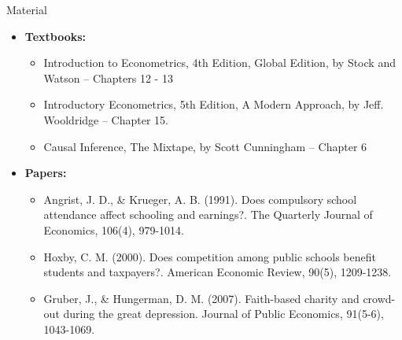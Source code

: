 \documentclass[notes,10pt, aspectratio=169]{beamer}
\begin{document}
\begin{frame}[allowframebreaks]{Material}
\begin{itemize}
    \item[--] \textbf{Textbooks:}
    \begin{itemize}
        \item Introduction to Econometrics, 4th Edition, Global Edition, by Stock and Watson -- Chapters 12 - 13
        \item Introductory Econometrics, 5th Edition, A Modern Approach, by Jeff. Wooldridge -- Chapter 15.
        \item Causal Inference, The Mixtape, by Scott Cunningham -- Chapter 6
    \end{itemize}
    \item[--] \textbf{Papers:}
    \begin{itemize}
        \item Angrist, J. D., \& Krueger, A. B. (1991). Does compulsory school attendance affect schooling and earnings?. The Quarterly Journal of Economics, 106(4), 979-1014.
        \item Hoxby, C. M. (2000). Does competition among public schools benefit students and taxpayers?. American Economic Review, 90(5), 1209-1238.
        \item Gruber, J., \& Hungerman, D. M. (2007). Faith-based charity and crowd-out during the great depression. Journal of Public Economics, 91(5-6), 1043-1069.
    \end{itemize}
\end{itemize}
\scriptsize{

 
}
\end{frame}
\end{document}
